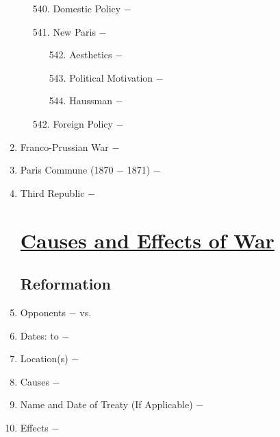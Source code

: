 \documentclass[12pt]{article}
\begin{document}
\begin{enumerate}
\begin{enumerate}[label=\arabic{*}.]
\begin{enumerate}[label=\arabic{*}.]
\setcounter{enumiii}{539}

\item Domestic Policy $-$ 

\item New Paris $-$ 

\begin{enumerate}[label=\arabic{*}.]
\setcounter{enumiv}{541}

\item Aesthetics $-$ 

\item Political Motivation $-$ 

\item Haussman $-$ 

\end{enumerate}
\setcounter{enumiii}{544}

\item Foreign Policy $-$

\end{enumerate}
\end{enumerate}
\setcounter{enumi}{545}


\item Franco-Prussian War $-$

\item Paris Commune (1870 $-$ 1871) $-$ 

\item Third Republic $-$


\section{\underline{Causes and Effects of War}}

\subsection{Reformation} 

\item Opponents $-$ vs.

\item Dates: to $-$

\item Location(s) $-$ 

\item Causes $-$

\item Name and Date of Treaty (If Applicable) $-$ 

\item Effects $-$ 


\end{enumerate}
\end{document}
